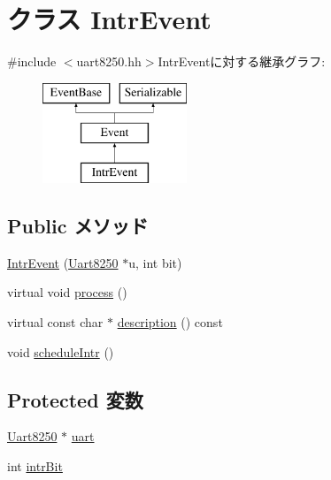 \hypertarget{classUart8250_1_1IntrEvent}{
\section{クラス IntrEvent}
\label{classUart8250_1_1IntrEvent}
}


{\ttfamily \#include $<$uart8250.hh$>$}IntrEventに対する継承グラフ:\begin{figure}[H]
\begin{center}
\leavevmode
\includegraphics[height=3cm]{classUart8250_1_1IntrEvent}
\end{center}
\end{figure}
\subsection*{Public メソッド}
\begin{DoxyCompactItemize}
\item 
\hyperlink{classUart8250_1_1IntrEvent_a9cb7bf0a580aa77d3175ccadf585457a}{IntrEvent} (\hyperlink{classUart_1_1Uart8250}{Uart8250} $\ast$u, int bit)
\item 
virtual void \hyperlink{classUart8250_1_1IntrEvent_a2e9c5136d19b1a95fc427e0852deab5c}{process} ()
\item 
virtual const char $\ast$ \hyperlink{classUart8250_1_1IntrEvent_a5a14fe478e2393ff51f02e9b7be27e00}{description} () const 
\item 
void \hyperlink{classUart8250_1_1IntrEvent_a5300e17e5d721149683cb2bac69c7571}{scheduleIntr} ()
\end{DoxyCompactItemize}
\subsection*{Protected 変数}
\begin{DoxyCompactItemize}
\item 
\hyperlink{classUart_1_1Uart8250}{Uart8250} $\ast$ \hyperlink{classUart8250_1_1IntrEvent_a79b2735a14e67de20ff110606a1c3997}{uart}
\item 
int \hyperlink{classUart8250_1_1IntrEvent_a32a4c55ff711c0b90d74b75e1d54ebce}{intrBit}
\end{DoxyCompactItemize}


